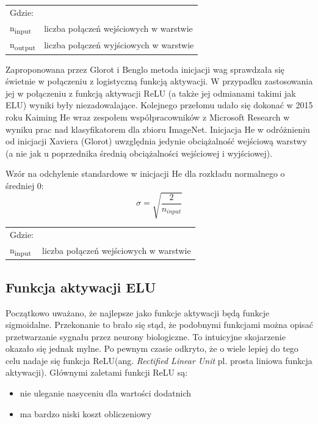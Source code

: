 \documentclass[a4paper,11pt]{article}
\begin{document}
    \smallskip

    \begin{tabular}{p{}p{}}
        Gdzie: \\
        n\textsubscript{input}  & liczba połączeń wejściowych w warstwie \\
        n\textsubscript{output} & liczba połączeń wyjściowych w warstwie \\
    \end{tabular}

    \bigskip

    Zaproponowana przez Glorot i Benglo metoda inicjacji wag sprawdzała się świetnie w połączeniu z logistyczną funkcją aktywacji. W przypadku zastosowania jej w połączeniu z funkcją aktywacji ReLU (a także jej odmianami takimi jak ELU) wyniki były niezadowalające. Kolejnego przełomu udało się dokonać w 2015 roku Kaiming He wraz zespołem współpracowników z Microsoft Research w wyniku prac nad klasyfikatorem dla zbioru ImageNet\cite{DelvingDeepIntoRectifiers2015}. Inicjacja He w odróżnieniu od inicjacji Xaviera (Glorot) uwzględnia jedynie obciążalność wejściową warstwy (a nie jak u poprzednika średnią obciążalności wejściowej i wyjściowej)\cite{UczenieMaszynowe2018}.

    \bigskip

    Wzór na odchylenie standardowe w inicjacji He dla rozkładu normalnego o średniej 0: \\
    \begin{equation}
        \label{equ:std_dev_he}
        \sigma = \sqrt{\frac{2}{n_{input}}}
    \end{equation}

    \smallskip

    \begin{tabular}{p{}p{}}
        Gdzie: \\
        n\textsubscript{input} & liczba połączeń wejściowych w warstwie \\
    \end{tabular}

    \subsection{Funkcja aktywacji ELU}

    Początkowo uważano, że najlepsze jako funkcje aktywacji będą funkcje sigmoidalne. Przekonanie to brało się stąd, że podobnymi funkcjami można opisać przetwarzanie sygnału przez neurony biologiczne. To intuicyjne skojarzenie okazało się jednak mylne. Po pewnym czasie odkryto, że o wiele lepiej do tego celu nadaje się funkcja ReLU(ang. \textit{Rectified Linear Unit} pl. prosta liniowa funkcja aktywacji)\cite{UczenieMaszynowe2018}. Głównymi zaletami funkcji ReLU są:
    \begin{itemize}
        \item nie uleganie nasyceniu dla wartości dodatnich
        \item ma bardzo niski koszt obliczeniowy
    \end{itemize}
\end{document}
